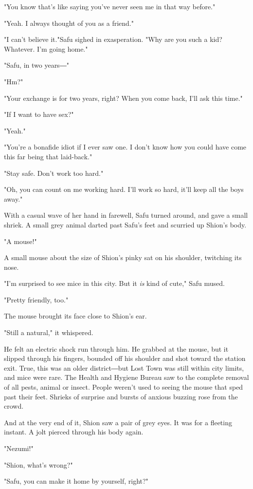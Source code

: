 "You know that's like saying you've never seen me in that way before."

"Yeah. I always thought of you as a friend."

"I can't believe it."Safu sighed in exasperation. "Why are you such a
kid? Whatever. I'm going home."

"Safu, in two years―"

"Hm?"

"Your exchange is for two years, right? When you come back, I'll ask
this time."

"If I want to have sex?"

"Yeah."

"You're a bonafide idiot if I ever saw one. I don't know how you could
have come this far being that laid-back."

"Stay safe. Don't work too hard."

"Oh, you can count on me working hard. I'll work so hard, it'll keep all
the boys away."

With a casual wave of her hand in farewell, Safu turned around, and gave
a small shriek. A small grey animal darted past Safu's feet and scurried
up Shion's body.

"A mouse!"

A small mouse about the size of Shion's pinky sat on his shoulder,
twitching its nose.

"I'm surprised to see mice in this city. But it \emph{is} kind of cute," Safu
mused.

"Pretty friendly, too."

The mouse brought its face close to Shion's ear.

"Still a natural," it whispered.

He felt an electric shock run through him. He grabbed at the mouse, but
it slipped through his fingers, bounded off his shoulder and shot toward
the station exit. True, this was an older district―but Lost Town was
still within city limits, and mice were rare. The Health and Hygiene
Bureau saw to the complete removal of all pests, animal or insect.
People weren't used to seeing the mouse that sped past their feet.
Shrieks of surprise and bursts of anxious buzzing rose from the crowd.

And at the very end of it, Shion saw a pair of grey eyes. It was for a
fleeting instant. A jolt pierced through his body again.

"Nezumi!"

"Shion, what's wrong?"

"Safu, you can make it home by yourself, right?"

